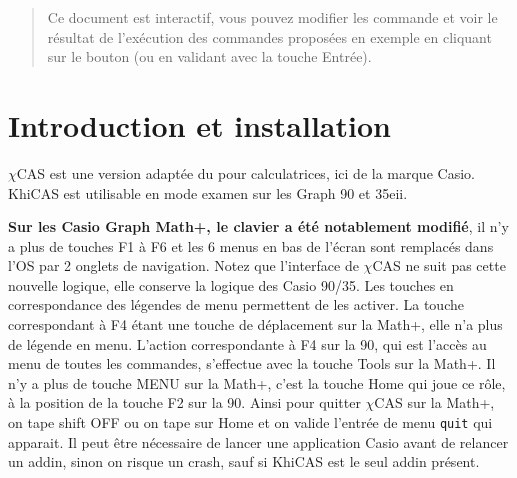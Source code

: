 \documentclass{article}
\begin{document}
\begin{giacjshere}
\begin{abstract}
Ce document est interactif, vous pouvez modifier les commande
et voir le r\'esultat de l'ex\'ecution des commandes
propos\'ees en exemple en cliquant sur le bouton  (ou en
validant avec la touche Entr\'ee).
\end{abstract}

\section{Introduction et installation} \label{sec:install}
$\chi$CAS est une version adapt\'ee du
pour calculatrices, ici de la marque Casio. 
KhiCAS est utilisable en mode examen sur les Graph 90 et 35eii.


{\bf Sur les Casio Graph Math+, le clavier a été notablement modifié}, il n'y
a plus de touches F1 à F6 et les 6 menus en bas de l'écran
sont remplacés dans l'OS par 2 onglets de navigation. 
Notez que l'interface de $\chi$CAS ne suit pas cette nouvelle logique,
elle conserve la logique des Casio 90/35. Les touches en correspondance 
des légendes de menu permettent de les activer. La touche correspondant
à F4 étant une touche de déplacement sur la Math+, elle n'a plus de 
légende en menu. 
L'action correspondante à F4 sur la 90, qui est l'accès au menu 
de toutes les commandes, s'effectue avec la touche Tools sur la Math+.
Il n'y a plus de touche MENU sur la Math+, c'est la touche Home
qui joue ce rôle, à la position de la touche F2 sur la 90.
Ainsi pour quitter $\chi$CAS sur la Math+, on tape shift OFF ou on 
tape sur Home et on valide l'entrée de menu \verb|quit| qui apparait.
Il peut être nécessaire de lancer une application Casio avant de relancer
un addin, sinon on risque un crash, sauf si KhiCAS est le seul addin présent.



\end{giacjshere}
\end{document}
